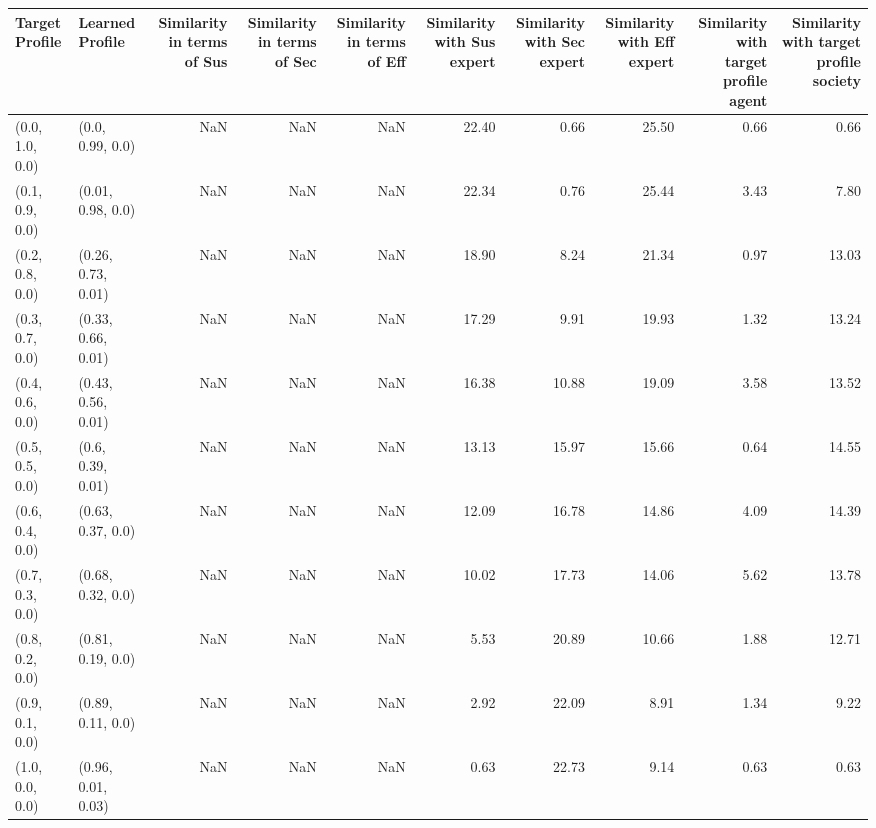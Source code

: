 \begin{tabular}{llrrrrrrrr}
\toprule
Target Profile & Learned Profile & Similarity in terms of Sus & Similarity in terms of Sec & Similarity in terms of Eff & Similarity with Sus expert & Similarity with Sec expert & Similarity with Eff expert & Similarity with target profile agent & Similarity with target profile society \\
\midrule
(0.0, 1.0, 0.0) & (0.0, 0.99, 0.0) & NaN & NaN & NaN & 22.40 & 0.66 & 25.50 & 0.66 & 0.66 \\
(0.1, 0.9, 0.0) & (0.01, 0.98, 0.0) & NaN & NaN & NaN & 22.34 & 0.76 & 25.44 & 3.43 & 7.80 \\
(0.2, 0.8, 0.0) & (0.26, 0.73, 0.01) & NaN & NaN & NaN & 18.90 & 8.24 & 21.34 & 0.97 & 13.03 \\
(0.3, 0.7, 0.0) & (0.33, 0.66, 0.01) & NaN & NaN & NaN & 17.29 & 9.91 & 19.93 & 1.32 & 13.24 \\
(0.4, 0.6, 0.0) & (0.43, 0.56, 0.01) & NaN & NaN & NaN & 16.38 & 10.88 & 19.09 & 3.58 & 13.52 \\
(0.5, 0.5, 0.0) & (0.6, 0.39, 0.01) & NaN & NaN & NaN & 13.13 & 15.97 & 15.66 & 0.64 & 14.55 \\
(0.6, 0.4, 0.0) & (0.63, 0.37, 0.0) & NaN & NaN & NaN & 12.09 & 16.78 & 14.86 & 4.09 & 14.39 \\
(0.7, 0.3, 0.0) & (0.68, 0.32, 0.0) & NaN & NaN & NaN & 10.02 & 17.73 & 14.06 & 5.62 & 13.78 \\
(0.8, 0.2, 0.0) & (0.81, 0.19, 0.0) & NaN & NaN & NaN & 5.53 & 20.89 & 10.66 & 1.88 & 12.71 \\
(0.9, 0.1, 0.0) & (0.89, 0.11, 0.0) & NaN & NaN & NaN & 2.92 & 22.09 & 8.91 & 1.34 & 9.22 \\
(1.0, 0.0, 0.0) & (0.96, 0.01, 0.03) & NaN & NaN & NaN & 0.63 & 22.73 & 9.14 & 0.63 & 0.63 \\
\bottomrule
\end{tabular}

